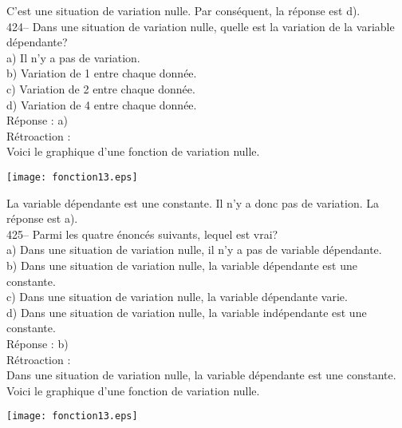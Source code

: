 ﻿\documentclass[letterpaper, 12pt]{article}
\begin{document}
C'est une situation de variation nulle.  Par cons\'equent, la r\'eponse est
d).\\

424-- Dans une situation de variation nulle, quelle est la variation de la
variable d\'ependante?\\
a) Il n'y a pas de variation.\\
b) Variation de 1 entre chaque donn\'ee.\\
c) Variation de 2 entre chaque donn\'ee.\\
d) Variation de 4 entre chaque donn\'ee.\\

R\'eponse :  a)\\

R\'etroaction : \\
Voici le graphique d'une fonction de variation nulle.\\
    \begin{center}
    \texttt{[image: fonction13.eps]}
    \end{center}
La variable d\'ependante est une constante.  Il n'y a donc pas de variation.
  La r\'eponse est a).\\

425-- Parmi les quatre \'enonc\'es suivants, lequel est vrai?\\
a) Dans une situation de variation nulle, il n'y a pas de variable
d\'ependante.\\
b) Dans une situation de variation nulle, la variable d\'ependante est une
constante.\\
c) Dans une situation de variation nulle, la variable d\'ependante varie.\\
d) Dans une situation de variation nulle, la variable ind\'ependante est une
constante.\\


R\'eponse :  b)\\

R\'etroaction : \\
Dans une situation de variation nulle, la variable d\'ependante est une
constante.  Voici le graphique d'une fonction de variation nulle.\\
    \begin{center}
    \texttt{[image: fonction13.eps]}
    \end{center}
\end{document}
